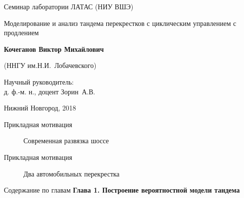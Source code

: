 \documentclass[10pt]{beamer}
\begin{document}
\begin{frame}
	
	\begin{center}

		\bigskip
		
 		{
 				{\small Семинар лаборатории ЛАТАС (НИУ ВШЭ)
		}

			\medskip
				\vfill

			{\large
Моделирование и анализ тандема перекрестков с циклическим управлением с продлением
}
			
 		}
		\vfill
		

		\medskip
		\textbf{Кочеганов Виктор Михайлович			}
		
				{\small 
	(ННГУ им.Н.И.~Лобачевского)
		}

		
	\end{center}
	
	\vfill
	
	
	\hfill 
	\begin{minipage}[h]{0.56\linewidth}\small
		Научный руководитель:\\
		д. ф.-м. н., доцент Зорин~А.В.
	\end{minipage}
	
	\vfill
	
	\vfill
	
	\centerline{\small Нижний Новгород, 2018}  
	
\end{frame}
  \begin{frame}{Прикладная мотивация}
      \begin{figure}[h]
    \centering
    \caption{Современная развязка шоссе}
    \label{VK:fig:1}
  \end{figure}
\end{frame}
  \begin{frame}{Прикладная мотивация}
      \begin{figure}[h]
    \centering
    \caption{Два автомобильных перекрестка}
    \label{VK:fig:1}
  \end{figure}
\end{frame}


  
  \begin{frame}{Содержание по главам}
  \Large{\textbf{Глава 1. Построение вероятностной модели тандема}}\par


      \end{frame}
  
\end{document}
